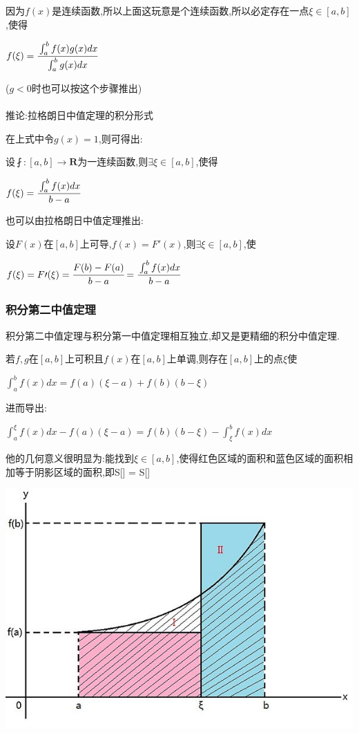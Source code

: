 \documentclass[UTF8,12pt]{ctexbook}
\newcommand{\defFunction}[1]{f(#1)}
\newcommand{\definiteIntegral}[2]{\int^{#1}_{#2}}
\begin{document}
{{{{因为$f(x)$是连续函数,所以上面这玩意是个连续函数,所以必定存在一点$\xi\in[a,b]$,使得

$\defFunction{\xi} = \cfrac{\definiteIntegral{b}{a}\defFunction{x}g(x)dx}{\definiteIntegral{b}{a}g(x)dx}$

($g<0$时也可以按这个步骤推出)
\\\\
推论:拉格朗日中值定理的积分形式

在上式中令$g(x) = 1$,则可得出:

设$\fint : [a,b] \to \mathbf{R}$为一连续函数,则$\exists\xi\in[a,b]$,使得

$\defFunction{\xi} = \cfrac{\definiteIntegral{b}{a}\defFunction{x}dx}{b - a}$

也可以由拉格朗日中值定理推出:

设$F(x)$在$[a,b]$上可导,$\defFunction{x} = F\prime(x)$,则$\exists\xi\in[a,b]$,使

$\defFunction{\xi} = F\prime(\xi) = \cfrac{F(b) - F(a)}{b - a} = \cfrac{\definiteIntegral{b}{a}\defFunction{x}dx}{b - a}$

}%

\subsubsection{积分第二中值定理}{

积分第二中值定理与积分第一中值定理相互独立,却又是更精细的积分中值定理.

若$f,g$在$[a,b]$上可积且$f(x)$在$[a,b]$上单调,则存在$[a,b]$上的点$\xi$使

$\definiteIntegral{b}{a}\defFunction{x}dx = \defFunction{a}(\xi - a) + \defFunction{b}(b - \xi)$

进而导出:

$\definiteIntegral{\xi}{a}\defFunction{x}dx -\defFunction{a}(\xi - a) = \defFunction{b}(b - \xi) - \definiteIntegral{b}{\xi}\defFunction{x}dx$

他的几何意义很明显为:能找到$\xi\in[a,b]$,使得红色区域的面积和蓝色区域的面积相加等于阴影区域的面积,即S[\uppercase\expandafter{}] = S[\uppercase\expandafter{}]

\includegraphics{resources/Geometric_explanation_of_the_second_mean_value_theorem_for_integration.jpg}

}}}}
\end{document}
